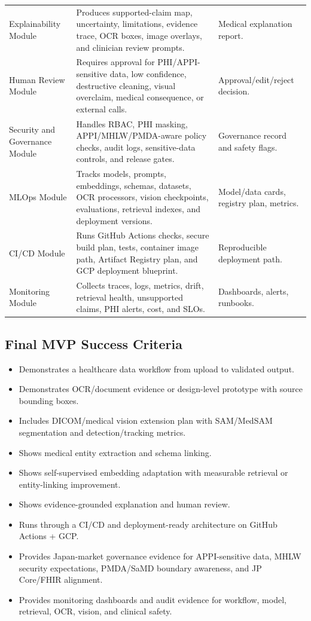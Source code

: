 \documentclass[11pt,a4paper]{article}
\begin{document}
\begin{longtable}{p{}p{}p{}}
Explainability Module & Produces supported-claim map, uncertainty, limitations, evidence trace, OCR boxes, image overlays, and clinician review prompts. & Medical explanation report. \\
Human Review Module & Requires approval for PHI/APPI-sensitive data, low confidence, destructive cleaning, visual overclaim, medical consequence, or external calls. & Approval/edit/reject decision. \\
Security and Governance Module & Handles RBAC, PHI masking, APPI/MHLW/PMDA-aware policy checks, audit logs, sensitive-data controls, and release gates. & Governance record and safety flags. \\
MLOps Module & Tracks models, prompts, embeddings, schemas, datasets, OCR processors, vision checkpoints, evaluations, retrieval indexes, and deployment versions. & Model/data cards, registry plan, metrics. \\
CI/CD Module & Runs GitHub Actions checks, secure build plan, tests, container image path, Artifact Registry plan, and GCP deployment blueprint. & Reproducible deployment path. \\
Monitoring Module & Collects traces, logs, metrics, drift, retrieval health, unsupported claims, PHI alerts, cost, and SLOs. & Dashboards, alerts, runbooks. \\
\bottomrule
\end{longtable}

\subsection{Final MVP Success Criteria}

\begin{itemize}
  \item Demonstrates a healthcare data workflow from upload to validated output.
  \item Demonstrates OCR/document evidence or design-level prototype with source bounding boxes.
  \item Includes DICOM/medical vision extension plan with SAM/MedSAM segmentation and detection/tracking metrics.
  \item Shows medical entity extraction and schema linking.
  \item Shows self-supervised embedding adaptation with measurable retrieval or entity-linking improvement.
  \item Shows evidence-grounded explanation and human review.
  \item Runs through a CI/CD and deployment-ready architecture on GitHub Actions + GCP.
  \item Provides Japan-market governance evidence for APPI-sensitive data, MHLW security expectations, PMDA/SaMD boundary awareness, and JP Core/FHIR alignment.
  \item Provides monitoring dashboards and audit evidence for workflow, model, retrieval, OCR, vision, and clinical safety.
\end{itemize}
\end{document}
